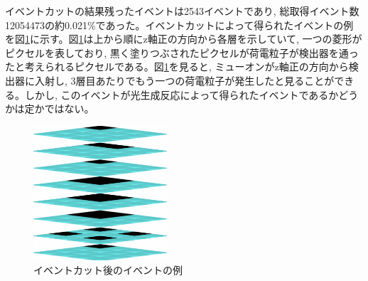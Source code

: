 イベントカットの結果残ったイベントは2543イベントであり, 総取得イベント数12054473の約0.021\%であった。イベントカットによって得られたイベントの例を図\ref{fig:eventcuted_event}に示す。図\ref{fig:eventcuted_event}は上から順にz軸正の方向から各層を示していて, 一つの菱形がピクセルを表しており, 黒く塗りつぶされたピクセルが荷電粒子が検出器を通ったと考えられるピクセルである。図\ref{fig:eventcuted_event}を見ると, ミューオンがz軸正の方向から検出器に入射し, 3層目あたりでもう一つの荷電粒子が発生したと見ることができる。しかし, このイベントが光生成反応によって得られたイベントであるかどうかは定かではない。
\begin{figure}[H]
    \centering
    \includegraphics[height=5.0cm]{img/eventcutted_figure.png}
    \caption{イベントカット後のイベントの例}
    \label{fig:eventcuted_event}
\end{figure}

